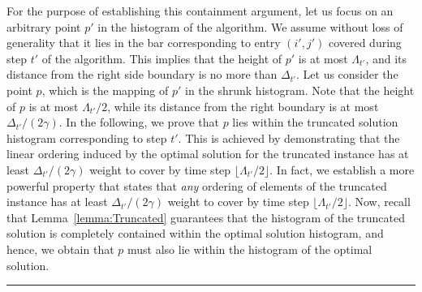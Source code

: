 \documentclass[11pt]{article}
\theoremstyle{plain}
\theoremstyle{definition}
\newcommand{\qedsymb}{\hfill{\rule{2mm}{2mm}}}
\renewenvironment{proof}{\begin{trivlist} \item[\hspace{\labelsep}{\bf \noindent Proof.\/}] }{\qedsymb\end{trivlist}}\newenvironment{proofof}[1]{\begin{trivlist} \item[\hspace{\labelsep}{\bf \noindent Proof of #1.\/}] }{\qedsymb\end{trivlist}}\newenvironment{MyEqn}[1]{\setlength\arraycolsep{2pt}\begin{eqnarray*} #1}{\end{eqnarray*}}
\newcommand{\floor}[1]{\lfloor #1 \rfloor}
\begin{document}
\begin{proof}
For the purpose of establishing this containment argument, let us
focus on an arbitrary point $p'$ in the histogram of the
algorithm. We assume without loss of generality that it lies in
the bar corresponding to entry $(i',j')$ covered during step $t'$
of the algorithm. This implies that the height of $p'$ is at most
$\Lambda_{t'}$, and its distance from the right side boundary is
no more than $\Delta_{t'}$. Let us consider the point $p$, which
is the mapping of $p'$ in the shrunk histogram. Note that the
height of $p$ is at most $\Lambda_{t'} / 2$, while its distance
from the right boundary is at most $\Delta_{t'} / (2\gamma)$. In
the following, we prove that $p$ lies within the truncated
solution histogram corresponding to step $t'$. This is achieved by
demonstrating that the linear ordering induced by the optimal
solution for the truncated instance has at least $\Delta_{t'} /
(2\gamma)$ weight to cover by time step $\floor{\Lambda_{t'} /
2}$. In fact, we establish a more powerful property that states
that \emph{any} ordering of elements of the truncated instance has
at least $\Delta_{t'} / (2\gamma)$ weight to cover by time step
$\floor{\Lambda_{t'} / 2}$. Now, recall that
Lemma~\ref{lemma:Truncated} guarantees that the histogram of the
truncated solution is completely contained within the optimal
solution histogram, and hence, we obtain that $p$ must also lie
within the histogram of the optimal solution.


\end{proof}
\end{document}
